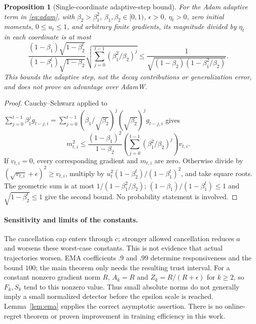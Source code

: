 \documentclass[11pt]{article}
\newtheorem{proposition}[theorem]{Proposition}
\theoremstyle{definition}
\theoremstyle{remark}
\begin{document}
\begin{proposition}[Single-coordinate adaptive-step bound]\label{prop:spike}
For the Adam adaptive term in \eqref{eq:adam}, with $\beta_2>\beta_1^2$,
$\beta_1,\beta_2\in[0,1)$, $\epsilon>0$, $\eta_t>0$, zero initial moments,
$0\le u_t\le1$, and arbitrary finite gradients, its magnitude divided by
$\eta_t$ in each coordinate is at most
\begin{equation}\label{eq:spike}
 \frac{(1-\beta_1)\sqrt{1-\beta_2^t}}
      {(1-\beta_1^t)\sqrt{1-\beta_2}}
 \sqrt{\sum_{j=0}^{t-1}(\beta_1^2/\beta_2)^j}
 \le\frac{1}{\sqrt{(1-\beta_2)(1-\beta_1^2/\beta_2)}}.
\end{equation}
This bounds the adaptive step, not the decay contributions or generalization
error, and does not prove an advantage over AdamW.
\end{proposition}
\begin{proof}
Cauchy--Schwarz applied to
$\sum_{j=0}^{t-1}\beta_1^j g_{t-j,i}
=\sum_{j=0}^{t-1}(\beta_1/\sqrt{\beta_2})^j
 (\sqrt{\beta_2})^j g_{t-j,i}$ gives
\[
 m_{t,i}^2\le\frac{(1-\beta_1)^2}{1-\beta_2}
 \left(\sum_{j=0}^{t-1}(\beta_1^2/\beta_2)^j\right)v_{t,i}.
\]
If $v_{t,i}=0$, every corresponding gradient and $m_{t,i}$ are zero.
Otherwise divide by $(\sqrt{v_{t,i}}+\epsilon)^2\ge v_{t,i}$, multiply by
$u_t^2(1-\beta_2^t)/(1-\beta_1^t)^2$, and take square roots.
The geometric sum is at most $1/(1-\beta_1^2/\beta_2)$;
$(1-\beta_1)/(1-\beta_1^t)\le1$ and $\sqrt{1-\beta_2^t}\le1$ give the
second bound. No probability statement is involved.
\end{proof}

\paragraph{Sensitivity and limits of the constants.}
The cancellation cap enters through $c$; stronger allowed cancellation reduces
$a$ and worsens these worst-case constants. This is not evidence that actual
trajectories worsen. EMA coefficients $.9$ and $.99$ determine responsiveness
and the bound $100$; the main theorem only needs the resulting trust interval.
For a constant nonzero gradient norm $R$, $A_k=R$ and $Z_k=R/(R+\epsilon)$
for $k\ge2$, so $F_k,S_k$ tend to this nonzero value. Thus small absolute norms
do not generally imply a small normalized detector before the epsilon scale
is reached. Lemma~\ref{lem:ema} supplies the correct asymptotic assertion.
There is no online-regret theorem or proven improvement in training efficiency
in this work.
\end{document}
